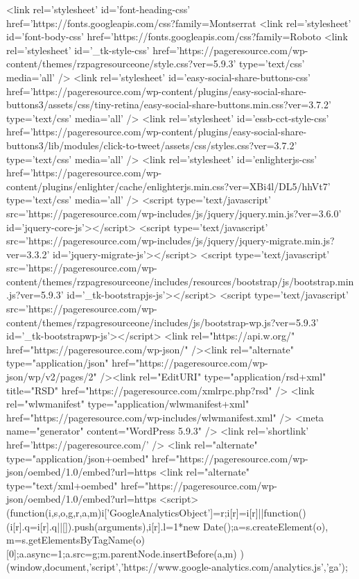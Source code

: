 {<link rel='stylesheet' id='font-heading-css'  href='https://fonts.googleapis.com/css?family=Montserrat%
<link rel='stylesheet' id='font-body-css'  href='https://fonts.googleapis.com/css?family=Roboto%
<link rel='stylesheet' id='_tk-style-css'  href='https://pageresource.com/wp-content/themes/rzpagresourceone/style.css?ver=5.9.3' type='text/css' media='all' />
<link rel='stylesheet' id='easy-social-share-buttons-css'  href='https://pageresource.com/wp-content/plugins/easy-social-share-buttons3/assets/css/tiny-retina/easy-social-share-buttons.min.css?ver=3.7.2' type='text/css' media='all' />
<link rel='stylesheet' id='essb-cct-style-css'  href='https://pageresource.com/wp-content/plugins/easy-social-share-buttons3/lib/modules/click-to-tweet/assets/css/styles.css?ver=3.7.2' type='text/css' media='all' />
<link rel='stylesheet' id='enlighterjs-css'  href='https://pageresource.com/wp-content/plugins/enlighter/cache/enlighterjs.min.css?ver=XBi4l/DL5/hhVt7' type='text/css' media='all' />
<script type='text/javascript' src='https://pageresource.com/wp-includes/js/jquery/jquery.min.js?ver=3.6.0' id='jquery-core-js'></script>
<script type='text/javascript' src='https://pageresource.com/wp-includes/js/jquery/jquery-migrate.min.js?ver=3.3.2' id='jquery-migrate-js'></script>
<script type='text/javascript' src='https://pageresource.com/wp-content/themes/rzpagresourceone/includes/resources/bootstrap/js/bootstrap.min.js?ver=5.9.3' id='_tk-bootstrapjs-js'></script>
<script type='text/javascript' src='https://pageresource.com/wp-content/themes/rzpagresourceone/includes/js/bootstrap-wp.js?ver=5.9.3' id='_tk-bootstrapwp-js'></script>
<link rel="https://api.w.org/" href="https://pageresource.com/wp-json/" /><link rel="alternate" type="application/json" href="https://pageresource.com/wp-json/wp/v2/pages/2" /><link rel="EditURI" type="application/rsd+xml" title="RSD" href="https://pageresource.com/xmlrpc.php?rsd" />
<link rel="wlwmanifest" type="application/wlwmanifest+xml" href="https://pageresource.com/wp-includes/wlwmanifest.xml" /> 
<meta name="generator" content="WordPress 5.9.3" />
<link rel='shortlink' href='https://pageresource.com/' />
<link rel="alternate" type="application/json+oembed" href="https://pageresource.com/wp-json/oembed/1.0/embed?url=https%
<link rel="alternate" type="text/xml+oembed" href="https://pageresource.com/wp-json/oembed/1.0/embed?url=https%
  <script>
    (function(i,s,o,g,r,a,m){i['GoogleAnalyticsObject']=r;i[r]=i[r]||function(){
    (i[r].q=i[r].q||[]).push(arguments)},i[r].l=1*new Date();a=s.createElement(o),
    m=s.getElementsByTagName(o)[0];a.async=1;a.src=g;m.parentNode.insertBefore(a,m)
    })(window,document,'script','https://www.google-analytics.com/analytics.js','ga');

}
